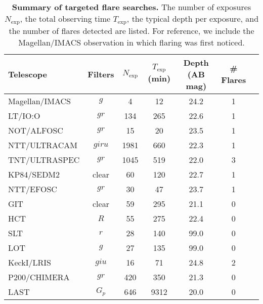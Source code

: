 \documentclass{nature_plusfigure}
\begin{document}
\begin{extended_data}
\begin{table}
\begin{center}
\caption{\textbf{Summary of targeted flare searches.} The number of exposures $N_\mathrm{exp}$, the total observing time $T_\mathrm{exp}$, the typical depth per exposure, and the number of flares detected are listed. For reference, we include the Magellan/IMACS observation in which flaring was first noticed.}
\label{tab:flare-searches}
\begin{tabular}{lcccccc} 
\hline\hline
Telescope & Filters & $N_\mathrm{exp}$ & $T_\mathrm{exp}$ (min) & Depth (AB mag) & \# Flares \\
\hline
Magellan/IMACS & $g$ & 4 & 12 & 24.2 & 1 \\
LT/IO:O & $gr$ & 134 & 265 & 22.6 & 1 \\
NOT/ALFOSC & $gr$ & 15 & 20 & 23.5 & 1 \\
NTT/ULTRACAM & $giru$ & 1981 & 660 & 22.3 & 1 \\
TNT/ULTRASPEC & $gr$ & 1045 & 519 & 22.0 & 3 \\
KP84/SEDM2 & clear & 60 & 120 & 22.7 & 1 \\
NTT/EFOSC & $gr$ & 30 & 47 & 23.7 & 1 \\
GIT & clear & 59 & 295 & 21.1 & 0 \\
HCT & $R$ & 55 & 275 & 22.4 & 0 \\
SLT & $r$ & 28 & 140 & 99.0 & 0 \\
LOT & $g$ & 27 & 135 & 99.0 & 0 \\
KeckI/LRIS & $giu$ & 16 & 71 & 24.8 & 2 \\
P200/CHIMERA & $gr$ & 420 & 350 & 21.3 & 0 \\
LAST & $G_p$ & 646 & 9312 & 20.0 & 0 \\
\hline
\end{tabular}
\end{center}
\end{table}


\end{extended_data}
\end{document}
